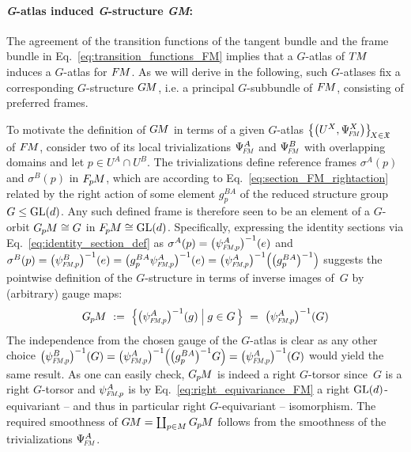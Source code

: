 \paragraph{\textit{G}-atlas induced \textit{G}-structure \textit{GM}:}

The agreement of the transition functions of the tangent bundle and the frame bundle in Eq.~\eqref{eq:transition_functions_FM} implies that a $G$-atlas of $T\mkern-1.5muM$ induces a $G$-atlas for $F\mkern-1.5muM$.
As we will derive in the following, such $G$-atlases fix a corresponding $G$-structure $G\mkern-1.4muM$, i.e. a principal $G$-subbundle of $F\mkern-1.5muM$, consisting of preferred frames.

To motivate the definition of $G\mkern-1.4muM$ in terms of a given $G$-atlas $\big\{ \big(U^X, \PsiFM^X \big) \big\}_{\!X\in\mathfrak{X}}\,$ of $F\mkern-1.5muM$, consider two of its local trivializations $\PsiFM^A$ and $\PsiFM^B$ with overlapping domains and let $p \in U^A\cap U^B$.
The trivializations define reference frames $\sigma^A(p)$ and $\sigma^B(p)$ in $F_{\mkern-1.5mu p}\mkern-1.0muM$, which are according to Eq.~\eqref{eq:section_FM_rightaction} related by the right action of some element $g_p^{BA}$ of the reduced structure group $G \leq \operatorname{GL}(d)$.
Any such defined frame is therefore seen to be an element of a $G$-orbit $G_{\mkern-1.3mu p}\mkern-1.2muM \cong G$ in $F_{\mkern-1.5mu p}\mkern-1.0muM \cong \operatorname{GL}(d)$.
Specifically, expressing the identity sections via Eq.~\eqref{eq:identity_section_def} as $\sigma^A(p) = \big( \psiFMp^A \big)^{-1} (e)$ and
$
\sigma^B(p)
= \big( \psiFMp^B \big)^{-1} (e)
= \big( g_p^{BA} \psiFMp^A \big)^{-1} (e)
= \big( \psiFMp^A \big)^{-1} \pig( \big( g_p^{BA} \big)^{-1} \pig)
$
suggests the pointwise definition of the $G$-structure in terms of inverse images of~$G$ by (arbitrary) gauge maps:
\begin{align}\label{eq:G_atlas_induced_G_structure_GM_def_ptwise}
    \GpM\ :=\ \pig\{ \big(\psiFMp^A \big)^{-1}(g) \;\pig|\; g\in G\, \pig\} \ =\ \big( \psiFMp^A \big)^{-1} (G)
\end{align}
The independence from the chosen gauge of the $G$-atlas is clear as any other choice
$
  \big( \psiFMp^B \big)^{-1} (G)
= \big( \psiFMp^A \big)^{-1} \pig( \big(g_p^{BA}\big)^{-1} G \pig)
= \big( \psiFMp^A \big)^{-1} (G)
$
would yield the same result.
As one can easily check, $G_{\mkern-1.3mu p}\mkern-1.2muM$ is indeed a right $G$-torsor since~$G$ is a right $G$-torsor and $\psiFMp^A$ is by Eq.~\eqref{eq:right_equivariance_FM} a right $\operatorname{GL}(d)$-equivariant -- and thus in particular right $G$-equivariant -- isomorphism.
The required smoothness of $G\mkern-1.4muM = \coprod_{p\in M} G_{\mkern-1.3mu p}\mkern-1.2muM$ follows from the smoothness of the trivializations $\PsiFM^A$.

